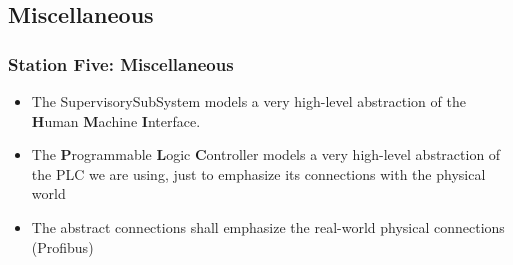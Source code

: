 \documentclass{beamer}
\begin{document}
\subsection{Miscellaneous}
\begin{frame}
\frametitle{Station Five: Miscellaneous}
	\begin{itemize}
		\item The SupervisorySubSystem models a very high-level abstraction of the \textbf{H}uman \textbf{M}achine \textbf{I}nterface.
		\item The \textbf{P}rogrammable \textbf{L}ogic \textbf{C}ontroller models a very high-level abstraction of the PLC we are using, just to emphasize its connections with the physical world
		\item The abstract connections shall emphasize the real-world physical connections (Profibus)
	\end{itemize}
\end{frame}
\end{document}
